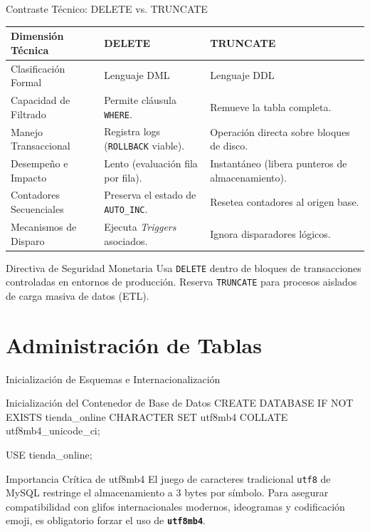 \documentclass[12pt, aspectratio=169, UTF8]{beamer}
\begin{document}
\begin{frame}{Contraste Técnico: DELETE vs. TRUNCATE}
  \begin{center}
  \small
  \renewcommand{\arraystretch}{1.2}
  \begin{tabularx}{0.95\textwidth}{@{} l X X @{}}
    \toprule
    \textbf{Dimensión Técnica} & \textbf{DELETE} & \textbf{TRUNCATE} \\
    \midrule
    Clasificación Formal       & Lenguaje DML & Lenguaje DDL \\
    Capacidad de Filtrado      & Permite cláusula \texttt{WHERE}. & Remueve la tabla completa. \\
    Manejo Transaccional       & Registra logs (\texttt{ROLLBACK} viable). & Operación directa sobre bloques de disco. \\
    Desempeño e Impacto        & Lento (evaluación fila por fila). & Instantáneo (libera punteros de almacenamiento). \\
    Contadores Secuenciales    & Preserva el estado de \texttt{AUTO\_INC}. & Resetea contadores al origen base. \\
    Mecanismos de Disparo      & Ejecuta \textit{Triggers} asociados. & Ignora disparadores lógicos. \\
    \bottomrule
  \end{tabularx}
  \end{center}
  \begin{alertblock}{Directiva de Seguridad Monetaria}
    Usa \texttt{DELETE} dentro de bloques de transacciones controladas en entornos de producción. Reserva \texttt{TRUNCATE} para procesos aislados de carga masiva de datos (ETL).
  \end{alertblock}
\end{frame}

\section{Administración de Tablas}

\begin{frame}[fragile]{Inicialización de Esquemas e Internacionalización}
  \begin{sqlbox}{Inicialización del Contenedor de Base de Datos}
CREATE DATABASE IF NOT EXISTS tienda_online
    CHARACTER SET utf8mb4
    COLLATE utf8mb4_unicode_ci;

USE tienda_online;
  \end{sqlbox}
  \vspace{4pt}
  \begin{alertblock}{Importancia Crítica de utf8mb4}
    El juego de caracteres tradicional \texttt{utf8} de MySQL restringe el almacenamiento a 3 bytes por símbolo. Para asegurar compatibilidad con glifos internacionales modernos, ideogramas y codificación emoji, es obligatorio forzar el uso de \textbf{\texttt{utf8mb4}}.
  \end{alertblock}
\end{frame}
\end{document}

